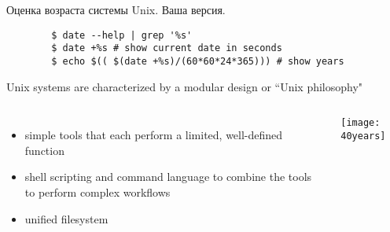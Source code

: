 \begin{frame}[fragile]{Оценка возраста системы Unix.}
Ваша версия.
 \pause
    \begin{lstlisting}
        $ date --help | grep '%s'
        $ date +%s # show current date in seconds
        $ echo $(( $(date +%s)/(60*60*24*365))) # show years
    \end{lstlisting}
\pause
Unix systems are characterized by a \alert{modular design} or ``Unix philosophy"
		\begin{columns}
\begin{itemize}
    \item simple tools that each perform a limited, well-defined function
    \item shell scripting and command language to combine the tools to perform complex workflows
    \item unified filesystem
\end{itemize}
            \texttt{[image: 40years]}
		\end{columns}
\end{frame}
